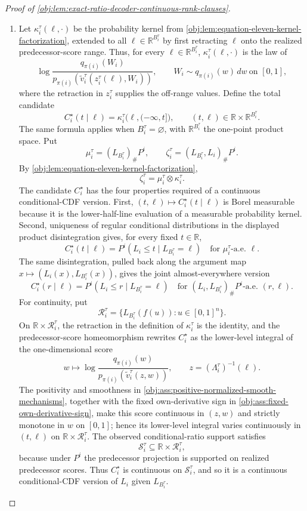 \documentclass[11pt]{article}
\begin{document}
\begin{proof}[Proof of \cref{obj:lem:exact-ratio-decoder-continuous-rank-clauses}]
\begin{enumerate}
\item Let \(\kappa_i^\tau(\ell,\cdot)\) be the probability kernel from \cref{obj:lem:equation-eleven-kernel-factorization}, extended to all \(\ell\in\mathbb R^{B_i^\tau}\) by first retracting \(\ell\) onto the realized predecessor-score range.  Thus, for every \(\ell\in\mathbb R^{B_i^\tau}\), \(\kappa_i^\tau(\ell,\cdot)\) is the law of
\[
\log\frac{q_{\pi(i)}(W_i)}
{p_{\pi(i)}\!\left(\widetilde v_i^\tau(z_i^\tau(\ell),W_i)\right)},
\qquad
W_i\sim q_{\pi(i)}(w)\,dw\ \text{on }[0,1],
\]
where the retraction in \(z_i^\tau\) supplies the off-range values.  Define the total candidate
\[
C_i^\star(t\mid \ell)
=
\kappa_i^\tau\bigl(\ell,(-\infty,t]\bigr),
\qquad
(t,\ell)\in\mathbb R\times\mathbb R^{B_i^\tau}.
\]
The same formula applies when \(B_i^\tau=\varnothing\), with \(\mathbb R^{B_i^\tau}\) the one-point product space.  Put
\[
\mu_i^\tau=(L_{B_i^\tau})_{\#}P^i,
\qquad
\zeta_i^\tau=(L_{B_i^\tau},L_i)_{\#}P^i .
\]
By \cref{obj:lem:equation-eleven-kernel-factorization},
\[
\zeta_i^\tau
=
\mu_i^\tau\otimes\kappa_i^\tau .
\]
The candidate \(C_i^\star\) has the four properties required of a continuous conditional-CDF version.  First, \((t,\ell)\mapsto C_i^\star(t\mid\ell)\) is Borel measurable because it is the lower-half-line evaluation of a measurable probability kernel.  Second, uniqueness of regular conditional distributions in the displayed product disintegration gives, for every fixed \(t\in\mathbb R\),
\[
C_i^\star(t\mid \ell)
=
P^i(L_i\le t\mid L_{B_i^\tau}=\ell)
\quad
\text{for }\mu_i^\tau\text{-a.e. }\ell .
\]
The same disintegration, pulled back along the argument map \(x\mapsto(L_i(x),L_{B_i^\tau}(x))\), gives the joint almost-everywhere version
\[
C_i^\star(r\mid \ell)
=
P^i(L_i\le r\mid L_{B_i^\tau}=\ell)
\quad
\text{for }(L_i,L_{B_i^\tau})_{\#}P^i\text{-a.e. }(r,\ell).
\]
For continuity, put
\[
\mathcal R_i^\tau
=
\{L_{B_i^\tau}(f(u)):u\in[0,1]^n\}.
\]
On \(\mathbb R\times\mathcal R_i^\tau\), the retraction in the definition of \(\kappa_i^\tau\) is the identity, and the predecessor-score homeomorphism rewrites \(C_i^\star\) as the lower-level integral of the one-dimensional score
\[
w\longmapsto
\log\frac{q_{\pi(i)}(w)}{p_{\pi(i)}(\widetilde v_i^\tau(z,w))},
\qquad z=(\Lambda_i^\tau)^{-1}(\ell).
\]
The positivity and smoothness in \cref{obj:ass:positive-normalized-smooth-mechanisms}, together with the fixed own-derivative sign in \cref{obj:ass:fixed-own-derivative-sign}, make this score continuous in \((z,w)\) and strictly monotone in \(w\) on \([0,1]\); hence its lower-level integral varies continuously in \((t,\ell)\) on \(\mathbb R\times\mathcal R_i^\tau\).  The observed conditional-ratio support satisfies
\[
\mathcal S_i^\tau
\subseteq
\mathbb R\times\mathcal R_i^\tau,
\]
because under \(P^i\) the predecessor projection is supported on realized predecessor scores.  Thus \(C_i^\star\) is continuous on \(\mathcal S_i^\tau\), and so it is a continuous conditional-CDF version of \(L_i\) given \(L_{B_i^\tau}\). %


\end{enumerate}
\end{proof}
\end{document}
